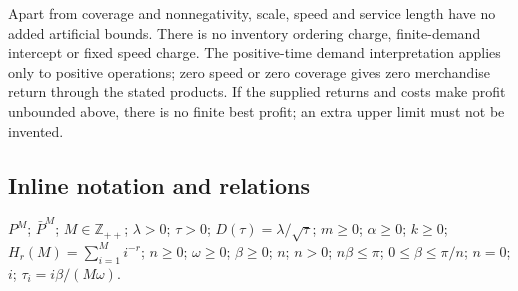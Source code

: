 \documentclass[10pt]{article}
\begin{document}
Apart from coverage and nonnegativity, scale, speed and service length have no added artificial bounds. There is no inventory ordering charge, finite-demand intercept or fixed speed charge. The positive-time demand interpretation applies only to positive operations; zero speed or zero coverage gives zero merchandise return through the stated products. If the supplied returns and costs make profit unbounded above, there is no finite best profit; an extra upper limit must not be invented.

\subsection*{Inline notation and relations}
$P^M$; $\bar P^M$; $M\in\mathbb Z_{++}$; $\lambda>0$; $\tau>0$; $D(\tau)=\lambda/\sqrt\tau$; $m\ge0$; $\alpha\ge0$; $k\ge0$; $H_r(M)=\sum_{i=1}^M i^{-r}$; $n\ge0$; $\omega\ge0$; $\beta\ge0$; $n$; $n>0$; $n\beta\le\pi$; $0\le\beta\le\pi/n$; $n=0$; $i$; $\tau_i=i\beta/(M\omega)$.
\end{document}
